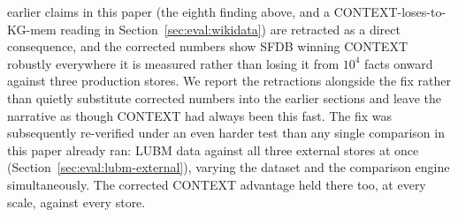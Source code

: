 \begin{enumerate}
          earlier claims in this paper (the eighth finding above, and a
          CONTEXT-loses-to-KG-mem reading in
          Section~\ref{sec:eval:wikidata}) are retracted as a direct
          consequence, and the corrected numbers show SFDB winning
          CONTEXT robustly everywhere it is measured rather than losing
          it from $10^4$ facts onward against three production stores.
          We report the retractions alongside the fix rather than quietly
          substitute corrected numbers into the earlier sections and
          leave the narrative as though CONTEXT had always been this
          fast. The fix was subsequently re-verified under an even
          harder test than any single comparison in this paper already
          ran: LUBM data against all three external stores at once
          (Section~\ref{sec:eval:lubm-external}), varying the dataset and
          the comparison engine simultaneously. The corrected CONTEXT
          advantage held there too, at every scale, against every store.
\end{enumerate}

